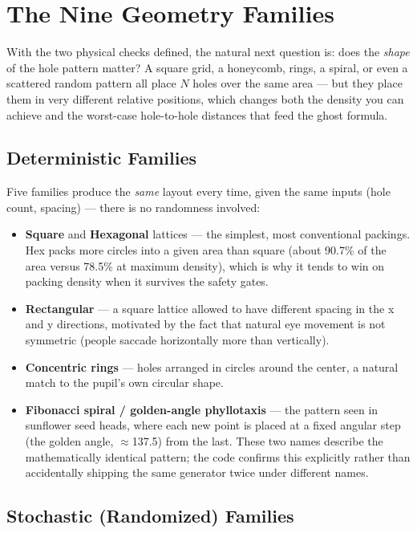 \section{The Nine Geometry Families}

With the two physical checks defined, the natural next question is: does the
\emph{shape} of the hole pattern matter? A square grid, a honeycomb, rings,
a spiral, or even a scattered random pattern all place $N$ holes over the
same area --- but they place them in very different relative positions,
which changes both the density you can achieve and the worst-case
hole-to-hole distances that feed the ghost formula.

\subsection{Deterministic Families}

Five families produce the \emph{same} layout every time, given the same
inputs (hole count, spacing) --- there is no randomness involved:
\begin{itemize}
  \item \textbf{Square} and \textbf{Hexagonal} lattices --- the simplest,
  most conventional packings. Hex packs more circles into a given area than
  square (about 90.7\% of the area versus 78.5\% at maximum density), which
  is why it tends to win on packing density when it survives the safety
  gates.
  \item \textbf{Rectangular} --- a square lattice allowed to have different
  spacing in the x and y directions, motivated by the fact that natural eye
  movement is not symmetric (people saccade horizontally more than
  vertically).
  \item \textbf{Concentric rings} --- holes arranged in circles around the
  center, a natural match to the pupil's own circular shape.
  \item \textbf{Fibonacci spiral / golden-angle phyllotaxis} --- the pattern
  seen in sunflower seed heads, where each new point is placed at a fixed
  angular step (the golden angle, $\approx$137.5\textdegree) from the last.
  These two names describe the mathematically identical pattern; the code
  confirms this explicitly rather than accidentally shipping the same
  generator twice under different names.
\end{itemize}

\subsection{Stochastic (Randomized) Families}

